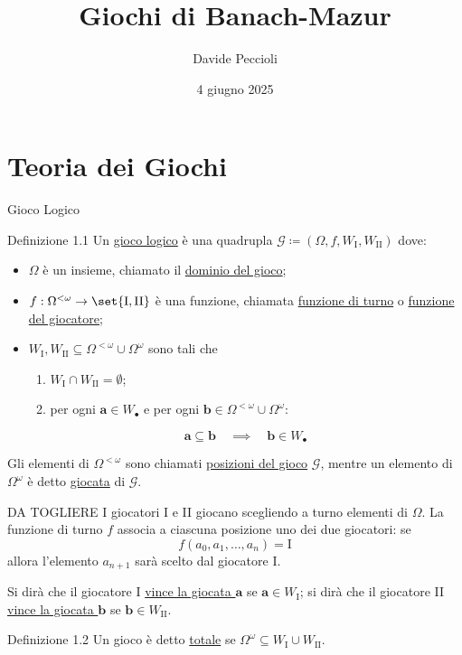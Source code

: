 \documentclass[babel]{beamer}
\institute[]{Università degli Studi di Torino}
\author{Davide Peccioli}
\date{4 giugno 2025}
\title{Giochi di Banach-Mazur}
\renewcommand{\href}[2]{#2}
\begin{document}
\maketitle
\section{Teoria dei Giochi}
\label{sec:org2700ea0}

\begin{frame}[label={sec:orgb34398e}]{Gioco Logico}
\begin{block}{Definizione 1.1}
Un \uline{gioco logico} è una quadrupla \(\mathcal{G} \coloneqq (\Omega, f, W_{\text{I}}, W_{\text{II}})\) dove:
\begin{itemize}
\item \(\Omega\) è un \href{../../../../../../../org/roam/20250130104331-insieme_mk.org}{insieme}, chiamato il \uline{dominio del gioco};
\item \(f:\Omega^{<\omega}\to \set{\text{I},\text{II}}\) è una \href{../../../../../../../org/roam/20250202170607-classe_relazione_binaria.org}{funzione}, chiamata \uline{funzione di turno} o \uline{funzione del giocatore};
\item \(W_{\text{I}},W_{\text{II}} \subseteq \Omega^{<\omega}\cup \Omega^{\omega}\) sono tali che
\begin{enumerate}
\item \(W_{\text{I}}\cap W_{\text{II}} = \emptyset\);
\item per ogni \(\bm{a} \in W_{\bullet}\) e per ogni \(\bm{b} \in\Omega^{<\omega}\cup \Omega^{\omega}\):
\end{enumerate}
\begin{equation*}
  \bm{a} \subseteq \bm{b}\quad\implies\quad \bm{b} \in W_{\bullet}
\end{equation*}
\end{itemize}

Gli elementi di \(\Omega^{<\omega}\) sono chiamati \uline{posizioni del gioco} \(\mathcal{G}\), mentre un elemento di \(\Omega^{\omega}\) è detto \uline{giocata} di \(\mathcal{G}\).
\end{block}
\end{frame}
\begin{frame}[label={sec:orgae23e0b}]{DA TOGLIERE}
I giocatori I e II giocano scegliendo a turno elementi di \(\Omega\). La funzione di turno \(f\) associa a ciascuna posizione uno dei due giocatori: se
\begin{equation*}
f(a_{0},a_{1},\dots,a_{n}) = \text{I}
\end{equation*}
allora l'elemento \(a_{n+1}\) sarà scelto dal giocatore I.

Si dirà che il giocatore I \uline{vince la giocata \(\bm{a}\)} se \(\bm{a} \in W_{\text{I}}\); si dirà che il giocatore II \uline{vince la giocata \(\bm{b}\)} se \(\bm{b} \in W_{\text{II}}\).
\begin{block}{Definizione 1.2}
Un gioco è detto \uline{totale} se \(\Omega^{\omega} \subseteq W_{\text{I}}\cup W_{\text{II}}\).
\end{block}
\end{frame}
\end{document}
